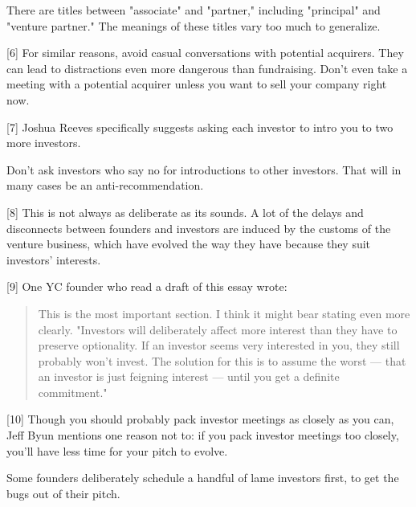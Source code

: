 There are titles
                  between "associate" and "partner," including "principal" and
                  "venture partner." The meanings of these titles vary too much
                  to generalize.

[6] For similar reasons, avoid casual conversations with
                  potential acquirers. They can lead to distractions even more
                  dangerous than fundraising. Don't even take a meeting with a
                  potential acquirer unless you want to sell your company right
                  now.

[7] Joshua Reeves specifically suggests asking each investor to
                  intro you to two more investors.

Don't ask
                  investors who say no for introductions to other investors.
                  That will in many cases be an anti-recommendation.

[8] This is not always as deliberate as its sounds. A lot of
                  the delays and disconnects between founders and investors are
                  induced by the customs of the venture business, which have
                  evolved the way they have because they suit investors'
                  interests.

[9] One YC founder who read a draft of this essay wrote:
                  \begin{quote}

                    This is the most important section. I think it might bear
                    stating even more clearly. "Investors will deliberately
                    affect more interest than they have to preserve optionality.
                    If an investor seems very interested in you, they still
                    probably won't invest. The solution for this is to assume
                    the worst --- that an investor is just feigning interest
                    --- until you get a definite commitment."
                  
\end{quote}

                  [10] Though you should probably pack investor meetings as
                  closely as you can, Jeff Byun mentions one reason not to: if
                  you pack investor meetings too closely, you'll have less time
                  for your pitch to evolve.

Some founders
                  deliberately schedule a handful of lame investors first, to
                  get the bugs out of their pitch.

